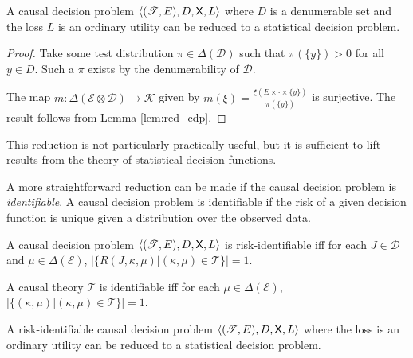 \begin{theorem}\label{th:cdp_to_sdp}
A causal decision problem $\langle (\mathscr{T},E),D,\mathsf{X},L\rangle$ where $D$ is a denumerable set and the loss $L$ is an ordinary utility can be reduced to a statistical decision problem.
\end{theorem}

\begin{proof}
Take some test distribution $\pi\in \Delta(\mathcal{D})$ such that $\pi(\{y\})>0$ for all $y\in D$. Such a $\pi$ exists by the denumerability of $\mathcal{D}$.

The map $m:\Delta(\mathcal{E}\otimes\mathcal{D})\to \mathscr{K}$ given by $m(\xi) = \frac{\xi(E\times \cdot\times \{y\})}{\pi(\{y\})}$ is surjective. The result follows from Lemma \ref{lem:red_cdp}.

\end{proof}

This reduction is not particularly practically useful, but it is sufficient to lift results from the theory of statistical decision functions.

\begin{theorem}

\end{theorem}

A more straightforward reduction can be made if the causal decision problem is \emph{identifiable}. A causal decision problem is identifiable if the risk of a given decision function is unique given a distribution over the observed data.

\begin{definition}[Identifiability]
A causal decision problem $\langle (\mathscr{T}, E), D, \mathsf{X}, L \rangle$ is risk-identifiable iff for each $J\in \mathscr{D}$ and $\mu\in \Delta(\mathcal{E})$, $|\{R(J,\kappa,\mu)|(\kappa,\mu)\in \mathscr{T}\}|=1$.

A causal theory $\mathscr{T}$ is identifiable iff for each $\mu\in \Delta(\mathcal{E})$, $|\{(\kappa,\mu)|(\kappa,\mu)\in\mathscr{T}\}|=1$.
\end{definition}

\begin{theorem}
A risk-identifiable causal decision problem $\langle (\mathscr{T}, E), D, \mathsf{X}, L \rangle$ where the loss is an ordinary utility can be reduced to a statistical decision problem.
\end{theorem}

